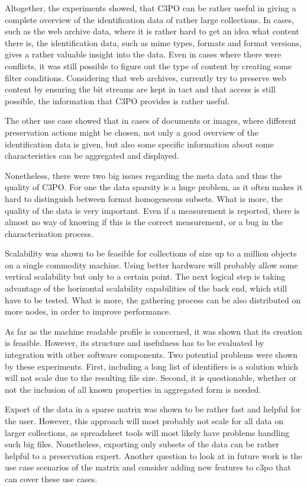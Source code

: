 Altogether, the experiments showed, that C3PO can be rather useful in giving a complete overview of the identification data of rather large collections. In cases, such as the web archive data, where it is rather hard to get an idea what content there is, the identification data, such as mime types, formats and format versions, gives a rather valuable insight into the data. Even in cases where there were conflicts, it was still possible to figure out the type of content by creating some filter conditions. Considering that web archives, currently try to preserve web content by ensuring the bit streams are kept in tact and that access is still possible, the information that C3PO provides is rather useful. 

The other use case showed that in cases of documents or images, where different preservation actions might be chosen, not only a good overview of the identification data is given, but also some specific information about some characteristics can be aggregated and displayed.

Nonetheless, there were two big issues regarding the meta data and thus the quality of C3PO. For one the data sparsity is a huge problem, as it often makes it hard to distinguish between format homogeneous subsets. What is more, the quality of the data is very important. Even if a measurement is reported, there is almost no way of knowing if this is the correct measurement, or a bug in the characterisation process.

Scalability was shown to be feasible for collections of size up to a million objects on a single commodity machine. Using  better hardware will probably allow some vertical scalability but only to a certain point. The next logical step is taking advantage of the horizontal scalability capabilities of the back end, which still have to be tested. What is more, the gathering process can be also distributed on more nodes, in order to improve performance.

As far as the machine readable profile is concerned, it was shown that its creation is feasible. However, its structure and usefulness has to be evaluated by integration with other software components. Two potential problems were shown by these experiments. First, including a long list of identifiers is a solution which will not scale due to the resulting file size.
Second, it is questionable, whether or not the inclusion of all known properties in aggregated form is needed.

Export of the data in a sparse matrix was shown to be rather fast and helpful for the user. However, this approach will most probably not scale for all data on larger collections, as spreadsheet tools will most likely have problems handling such big files. Nonetheless, exporting only subsets of the data can be rather helpful to a preservation
expert. Another question to look at in future work is the use case scenarios of the matrix and consider adding new features to c3po that can cover these use cases.

